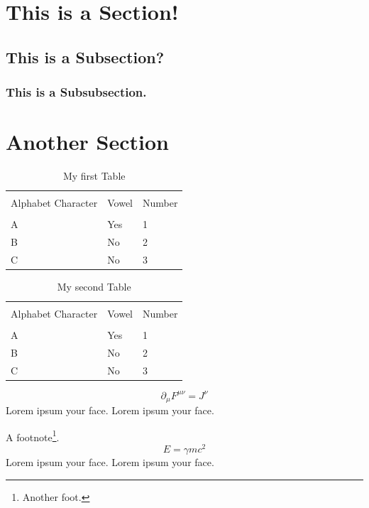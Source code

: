 \section{This is a Section!}

\lipsum[2-4]
\subsection{This is a Subsection?}

\lipsum[5-10]

\subsubsection{This is a Subsubsection.}

\lipsum

\section{Another Section}

\lipsum[2-4]

\begin{table}
\begin{center}
\begin{tabular}{lll}
\hline
\\[3pt]
Alphabet Character & Vowel & Number \\[3pt]
\hline
\\[3pt]
A & Yes & 1 \\
B & No & 2 \\
C & No & 3 \\[3pt]
\hline
\end{tabular}
\label{tbl1}
\caption{My first Table}
\end{center}
\end{table}

\lipsum[4-6]
\begin{table}
\begin{center}
\begin{tabular}{lll}
\hline
\\[3pt]
Alphabet Character & Vowel & Number \\[3pt]
\hline
\\[3pt]
A & Yes & 1 \\
B & No & 2 \\
C & No & 3 \\[3pt]
\hline
\end{tabular}
\label{tbl2}
\caption{My second Table}
\end{center}
\end{table}

\lipsum[1-12]
\begin{equation}
\partial_\mu F^{\mu\nu} = J^\nu
\end{equation}
Lorem ipsum your face. Lorem ipsum your face. 

\lipsum[1]A footnote\footnote{Another foot.}.\lipsum[2-5]
\begin{equation}
E = \gamma mc^2
\end{equation}
Lorem ipsum your face. Lorem ipsum your face. 

\lipsum[2-5]
